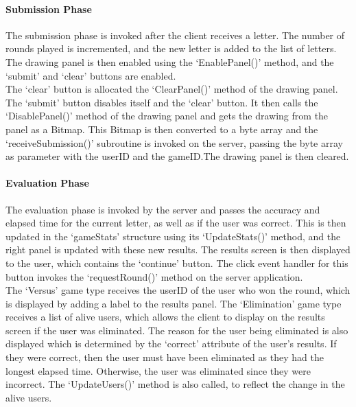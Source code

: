 \documentclass{article}
\begin{document}
\paragraph{Submission Phase\\}

The submission phase is invoked after the client receives a letter. The number of rounds played is incremented, and the new letter is added to the list of letters. The drawing panel is then enabled using the `EnablePanel()' method, and the `submit' and `clear' buttons are enabled. \\

The `clear' button is allocated the `ClearPanel()' method of the drawing panel. The `submit' button disables itself and the `clear' button. It then calls the `DisablePanel()' method of the drawing panel and gets the drawing from the panel as a Bitmap. This Bitmap is then converted to a byte array and the `receiveSubmission()' subroutine is invoked on the server, passing the byte array as parameter with the userID and the gameID.\@ The drawing panel is then cleared.

\paragraph{Evaluation Phase\\}

The evaluation phase is invoked by the server and passes the accuracy and elapsed time for the current letter, as well as if the user was correct. This is then updated in the `gameStats' structure using its `UpdateStats()' method, and the right panel is updated with these new results. The results screen is then displayed to the user, which contains the `continue' button. The click event handler for this button invokes the `requestRound()' method on the server application. \\

The `Versus' game type receives the userID of the user who won the round, which is displayed by adding a label to the results panel. The `Elimination' game type receives a list of alive users, which allows the client to display on the results screen if the user was eliminated. The reason for the user being eliminated is also displayed which is determined by the `correct' attribute of the user's results. If they were correct, then the user must have been eliminated as they had the longest elapsed time. Otherwise, the user was eliminated since they were incorrect. The `UpdateUsers()' method is also called, to reflect the change in the alive users.
\end{document}
